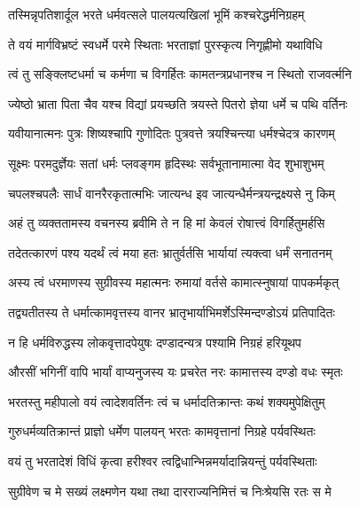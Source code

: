 \twolineshloka
{तस्मिन्नृपतिशार्दूल भरते धर्मवत्सले}
{पालयत्यखिलां भूमिं कश्चरेद्धर्मनिग्रहम्} %

\twolineshloka
{ते वयं मार्गविभ्रष्टं स्वधर्मे परमे स्थिताः}
{भरताज्ञां पुरस्कृत्य निगृह्णीमो यथाविधि} %

\twolineshloka
{त्वं तु सङ्क्लिष्टधर्मा च कर्मणा च विगर्हितः}
{कामतन्त्रप्रधानश्च न स्थितो राजवर्त्मनि} %

\twolineshloka
{ज्येष्ठो भ्राता पिता चैव यश्च विद्यां प्रयच्छति}
{त्रयस्ते पितरो ज्ञेया धर्मे च पथि वर्तिनः} %

\twolineshloka
{यवीयानात्मनः पुत्रः शिष्यश्चापि गुणोदितः}
{पुत्रवत्ते त्रयश्चिन्त्या धर्मश्चेदत्र कारणम्} %

\twolineshloka
{सूक्ष्मः परमदुर्ज्ञेयः सतां धर्मः प्लवङ्गम}
{हृदिस्थः सर्वभूतानामात्मा वेद शुभाशुभम्} %

\twolineshloka
{चपलश्चपलैः सार्धं वानरैरकृतात्मभिः}
{जात्यन्ध इव जात्यन्धैर्मन्त्रयन्द्रक्ष्यसे नु किम्} %

\twolineshloka
{अहं तु व्यक्ततामस्य वचनस्य ब्रवीमि ते}
{न हि मां केवलं रोषात्त्वं विगर्हितुमर्हसि} %

\twolineshloka
{तदेतत्कारणं पश्य यदर्थं त्वं मया हतः}
{भ्रातुर्वर्तसि भार्यायां त्यक्त्वा धर्मं सनातनम्} %

\twolineshloka
{अस्य त्वं धरमाणस्य सुग्रीवस्य महात्मनः}
{रुमायां वर्तसे कामात्स्नुषायां पापकर्मकृत्} %

\twolineshloka
{तद्व्यतीतस्य ते धर्मात्कामवृत्तस्य वानर}
{भ्रातृभार्याभिमर्शेऽस्मिन्दण्डोऽयं प्रतिपादितः} %

\twolineshloka
{न हि धर्मविरुद्धस्य लोकवृत्तादपेयुषः}
{दण्डादन्यत्र पश्यामि निग्रहं हरियूथप} %

\twolineshloka
{औरसीं भगिनीं वापि भार्यां वाप्यनुजस्य यः}
{प्रचरेत नरः कामात्तस्य दण्डो वधः स्मृतः} %

\twolineshloka
{भरतस्तु महीपालो वयं त्वादेशवर्तिनः}
{त्वं च धर्मादतिक्रान्तः कथं शक्यमुपेक्षितुम्} %

\twolineshloka
{गुरुधर्मव्यतिक्रान्तं प्राज्ञो धर्मेण पालयन्}
{भरतः कामवृत्तानां निग्रहे पर्यवस्थितः} %

\twolineshloka
{वयं तु भरतादेशं विधिं कृत्वा हरीश्वर}
{त्वद्विधान्भिन्नमर्यादान्नियन्तुं पर्यवस्थिताः} %

\twolineshloka
{सुग्रीवेण च मे सख्यं लक्ष्मणेन यथा तथा}
{दारराज्यनिमित्तं च निःश्रेयसि रतः स मे} %

